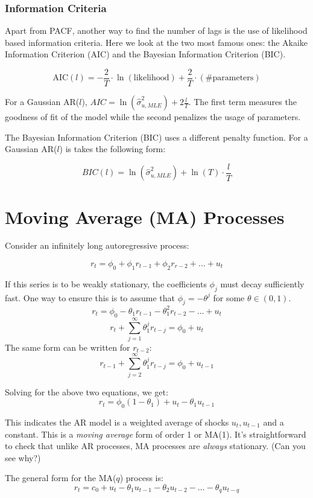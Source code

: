\documentclass[11pt,]{article}
\begin{document}
\subsubsection{Information Criteria}\label{information-criteria}

Apart from PACF, another way to find the number of lags is the use of
likelihood based information criteria. Here we look at the two most
famous ones: the Akaike Information Criterion (AIC) and the Bayesian
Information Criterion (BIC).

\[\text{AIC}(l) = -\frac{2}{T}\cdot\ln(\text{likelihood})+\frac{2}{T}\cdot(\#\text{parameters})\]

For a Gaussian AR(\(l\)),
\(AIC=\ln(\hat{\sigma}^2_{u,MLE})+2\frac{l}{T}\). The first term
measures the goodness of fit of the model while the second penalizes the
usage of parameters.

The Bayesian Information Criterion (BIC) uses a different penalty
function. For a Gaussian AR(\(l\)) is takes the following form:

\[BIC(l)=\ln(\hat{\sigma}^2_{u,MLE})+\ln(T)\cdot \frac{l}{T}\]

\section{Moving Average (MA)
Processes}\label{moving-average-ma-processes}

Consider an infinitely long autoregressive process:

\[r_t = \phi_0+\phi_1r_{t-1}+\phi_2r_{r-2}+\hdots+u_t\]

If this series is to be weakly stationary, the coefficients \(\phi_j\)
must decay sufficiently fast. One way to ensure this is to assume that
\(\phi_j=-\theta^j\) for some \(\theta\in(0,1)\).
\[r_t = \phi_0-\theta_1r_{t-1}-\theta_1^2r_{t-2}-\hdots+u_t\]
\[r_t+\sum_{j=1}^\infty \theta_1^jr_{t-j}=\phi_0+u_t\] The same form can
be written for \(r_{t-2}\):
\[r_{t-1}+\sum_{j=2}^\infty \theta_1^jr_{t-j}=\phi_0+u_{t-1}\]

Solving for the above two equations, we get:
\[r_t = \phi_0(1-\theta_1) + u_t -\theta_1u_{t-1}\]

This indicates the AR model is a weighted average of shocks
\(u_t, u_{t-1}\) and a constant. This is a \emph{moving average} form of
order 1 or MA(1). It's straightforward to check that unlike AR
processes, MA processes are \emph{always} stationary. (Can you see why?)

The general form for the MA(\(q\)) process is:
\[r_t = c_0 + u_t -\theta_1u_{t-1}-\theta_2u_{t-2}-\hdots-\theta_qu_{t-q}\]
\end{document}
